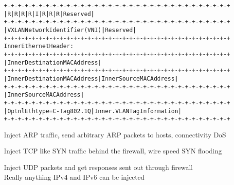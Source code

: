 \documentclass[Screen16to9,17pt]{foils}
\begin{document}
\begin{alltt}\footnotesize
+-+-+-+-+-+-+-+-+-+-+-+-+-+-+-+-+-+-+-+-+-+-+-+-+-+-+-+-+-+-+-+-+
|R|R|R|R|I|R|R|R|            Reserved                           |
+-+-+-+-+-+-+-+-+-+-+-+-+-+-+-+-+-+-+-+-+-+-+-+-+-+-+-+-+-+-+-+-+
|                VXLAN Network Identifier (VNI) |   Reserved    |
+-+-+-+-+-+-+-+-+-+-+-+-+-+-+-+-+-+-+-+-+-+-+-+-+-+-+-+-+-+-+-+-+
Inner Ethernet Header:
+-+-+-+-+-+-+-+-+-+-+-+-+-+-+-+-+-+-+-+-+-+-+-+-+-+-+-+-+-+-+-+-+
|             Inner Destination MAC Address                     |
+-+-+-+-+-+-+-+-+-+-+-+-+-+-+-+-+-+-+-+-+-+-+-+-+-+-+-+-+-+-+-+-+
| Inner Destination MAC Address | Inner Source MAC Address      |
+-+-+-+-+-+-+-+-+-+-+-+-+-+-+-+-+-+-+-+-+-+-+-+-+-+-+-+-+-+-+-+-+
|                Inner Source MAC Address                       |
+-+-+-+-+-+-+-+-+-+-+-+-+-+-+-+-+-+-+-+-+-+-+-+-+-+-+-+-+-+-+-+-+
|OptnlEthtype = C-Tag 802.1Q    | Inner.VLAN Tag Information    |
+-+-+-+-+-+-+-+-+-+-+-+-+-+-+-+-+-+-+-+-+-+-+-+-+-+-+-+-+-+-+-+-+
\end{alltt}

\begin{list2}
\item Inject ARP traffic, send arbitrary ARP packets to hosts, connectivity DoS
\item Inject TCP like SYN traffic behind the firewall, wire speed SYN flooding
\item Inject UDP packets and get responses sent out through firewall\\
Really anything IPv4 and IPv6 can be injected
\end{list2}





\end{document}
